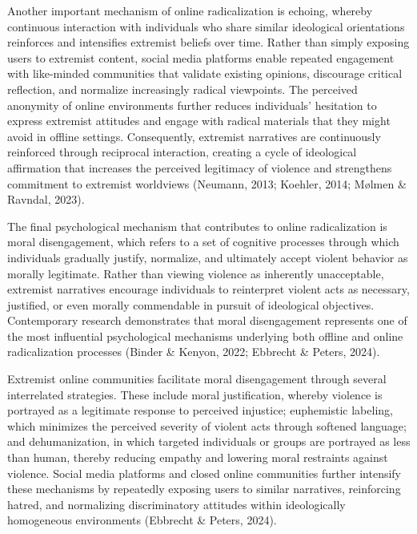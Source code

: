 \documentclass[10pt]{NSP1}
\begin{document}
\par\medskip{}\smallskip

Another important mechanism of online radicalization is echoing, whereby continuous interaction with individuals who share similar ideological orientations reinforces and intensifies extremist beliefs over time. Rather than simply exposing users to extremist content, social media platforms enable repeated engagement with like-minded communities that validate existing opinions, discourage critical reflection, and normalize increasingly radical viewpoints. The perceived anonymity of online environments further reduces individuals' hesitation to express extremist attitudes and engage with radical materials that they might avoid in offline settings. Consequently, extremist narratives are continuously reinforced through reciprocal interaction, creating a cycle of ideological affirmation that increases the perceived legitimacy of violence and strengthens commitment to extremist worldviews (Neumann, 2013; Koehler, 2014; Mølmen \& Ravndal, 2023).

\par\medskip{}\smallskip

The final psychological mechanism that contributes to online radicalization is moral disengagement, which refers to a set of cognitive processes through which individuals gradually justify, normalize, and ultimately accept violent behavior as morally legitimate. Rather than viewing violence as inherently unacceptable, extremist narratives encourage individuals to reinterpret violent acts as necessary, justified, or even morally commendable in pursuit of ideological objectives. Contemporary research demonstrates that moral disengagement represents one of the most influential psychological mechanisms underlying both offline and online radicalization processes (Binder \& Kenyon, 2022; Ebbrecht \& Peters, 2024).

Extremist online communities facilitate moral disengagement through several interrelated strategies. These include moral justification, whereby violence is portrayed as a legitimate response to perceived injustice; euphemistic labeling, which minimizes the perceived severity of violent acts through softened language; and dehumanization, in which targeted individuals or groups are portrayed as less than human, thereby reducing empathy and lowering moral restraints against violence. Social media platforms and closed online communities further intensify these mechanisms by repeatedly exposing users to similar narratives, reinforcing hatred, and normalizing discriminatory attitudes within ideologically homogeneous environments (Ebbrecht \& Peters, 2024).
\end{document}
